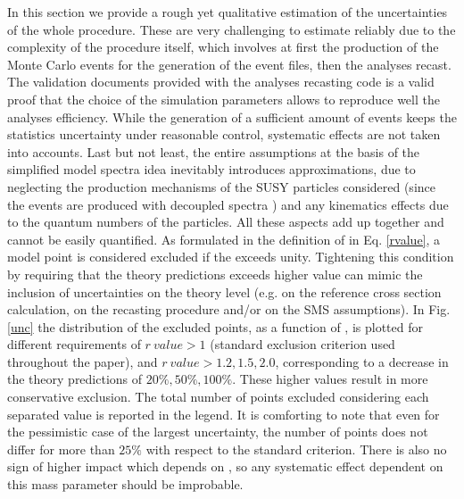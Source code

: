 \documentclass[epj,nopacs,fleqn]{svjour}
\begin{document}
In this section we provide a rough yet qualitative estimation of the uncertainties of the whole procedure. These are very challenging to estimate reliably due to the complexity of the procedure itself, which involves at first the production of the Monte Carlo events for the generation of the event files, then the analyses recast. The validation documents provided with the analyses recasting code is a valid proof that the choice of the simulation parameters allows to reproduce well the analyses efficiency. While the generation of a sufficient amount of events keeps the statistics uncertainty under reasonable control, systematic effects are not taken into accounts. Last but not least, the entire assumptions at the basis of the simplified model spectra idea inevitably introduces approximations, due to neglecting the production mechanisms of the SUSY particles considered (since the events are produced with decoupled spectra ) and any kinematics effects due to the quantum numbers of the particles. All these aspects add up together and cannot be easily quantified. As formulated in the definition of \SMO \RVALUE in Eq. \ref{rvalue}, a model point is considered excluded if the \RVALUE exceeds unity. Tightening this condition by requiring that the theory predictions exceeds higher value can mimic the inclusion of uncertainties on the theory level (e.g. on the reference cross section calculation, on the recasting procedure and/or on the SMS assumptions). 
In Fig. \ref{unc} the distribution of the excluded points, as a function of \MGLU, is plotted for different \RVALUE requirements of $r\ value >1$ (standard exclusion criterion used throughout the paper), and $r\ value >1.2 , 1.5,2.0$, corresponding to a decrease in the theory predictions of $20\%,50\%,100\%$. These higher values result in more conservative exclusion. The total number of points excluded considering each separated value is reported in the legend. It is comforting to note that even for the pessimistic case of the largest uncertainty, the number of points does not differ for more than $25\%$ with respect to the standard criterion. There is also no sign of higher impact which depends on \MGLU, so any systematic effect dependent on this mass parameter should be improbable. 
\end{document}
